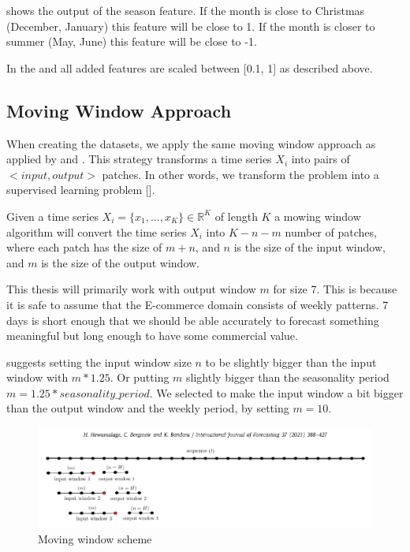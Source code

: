  shows the output of the season feature.
If the month is close to Christmas (December, January) this feature will be close to 1.
If the month is closer to summer (May, June) this feature will be close to -1.

In the and all added features are scaled between [0.1, 1] as described above.


\subsection{Moving Window Approach}
\label{section:Data:Preprocessing:moving-window-approach}
When creating the datasets, we apply the same moving window approach as applied by \cite{Bandara2019} and \cite{Hewamalage2021}.
This strategy transforms a time series $X_i$ into pairs of $<input, output>$ patches.
In other words, we transform the problem into a supervised learning problem [].

Given a time series $X_i = \{x_1, ..., x_K\} \in \mathbb{R}^K$ of length $K$ a mowing
window algorithm will convert the time series $X_i$ into $K-n-m$ number of patches,
where each patch has the size of $m+n$, and $n$ is the size of the input window,
and $m$ is the size of the output window.

This thesis will primarily work with output window $m$ for size 7.
This is because it is safe to assume that the E-commerce domain consists of weekly patterns.
7 days is short enough that we should be able accurately to forecast something meaningful
but long enough to have some commercial value.

\cite{Hewamalage2021} suggests setting the input window size $n$ to be slightly
bigger than the input window with $m * 1.25$. Or putting $m$ slightly bigger than
the seasonality period $m = 1.25 * seasonality\_period$.
We selected to make the input window a bit bigger than the output window and the weekly
period, by setting $m = 10$.
\begin{figure}[h!]
  \centering
  \includegraphics[width=\textwidth]{./figs/illustrations/moving_window_illustration.png}
  \hfill
  \caption{Moving window scheme \citep{Hewamalage2021}}
  \label{fig:dataset:moving_window_scheme}
\end{figure}



